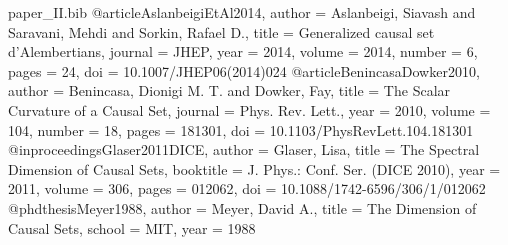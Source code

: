 
\begin{filecontents*}{paper_II.bib}
@article{AslanbeigiEtAl2014,
  author  = {Aslanbeigi, Siavash and Saravani, Mehdi and Sorkin, Rafael D.},
  title   = {Generalized causal set d’Alembertians},
  journal = {JHEP},
  year    = {2014},
  volume  = {2014},
  number  = {6},
  pages   = {24},
  doi     = {10.1007/JHEP06(2014)024}
}
@article{BenincasaDowker2010,
  author  = {Benincasa, Dionigi M. T. and Dowker, Fay},
  title   = {The Scalar Curvature of a Causal Set},
  journal = {Phys. Rev. Lett.},
  year    = {2010},
  volume  = {104},
  number  = {18},
  pages   = {181301},
  doi     = {10.1103/PhysRevLett.104.181301}
}
@inproceedings{Glaser2011DICE,
  author    = {Glaser, Lisa},
  title     = {The Spectral Dimension of Causal Sets},
  booktitle = {J. Phys.: Conf. Ser. (DICE 2010)},
  year      = {2011},
  volume    = {306},
  pages     = {012062},
  doi       = {10.1088/1742-6596/306/1/012062}
}
@phdthesis{Meyer1988,
  author  = {Meyer, David A.},
  title   = {The Dimension of Causal Sets},
  school  = {MIT},
  year    = {1988}
}
\end{filecontents*}

\documentclass[11pt]{article}

\usepackage[margin=1in]{geometry}
\usepackage{amsmath,amssymb,amsthm,mathtools}
\usepackage{graphicx}
\usepackage{hyperref}
\usepackage{microtype}
\usepackage[numbers,sort&compress]{natbib}
\usepackage{xcolor}
\usepackage{float}
\usepackage[section]{placeins}
\usepackage{bm}

\hypersetup{colorlinks=true, linkcolor=blue!50!black, citecolor=blue!50!black, urlcolor=blue!50!black}

\theoremstyle{plain}
\newtheorem{theorem}{Theorem}
\newtheorem{lemma}[theorem]{Lemma}
\theoremstyle{remark}
\newtheorem{remark}[theorem]{Remark}
\newcommand{\E}{\mathbb{E}}
\newcommand{\ellc}{\ell}

\graphicspath{{figs2/}{paper2/figs/}}
\newcommand{\SafeGraphic}[2]{%
  \IfFileExists{#1}{\texttt{[image: \#1]}}{%
    \fbox{\parbox[c][2.2in][c]{#2\linewidth}{\centering\small \textsf{Missing figure:}\\\texttt{#1}}}}}

